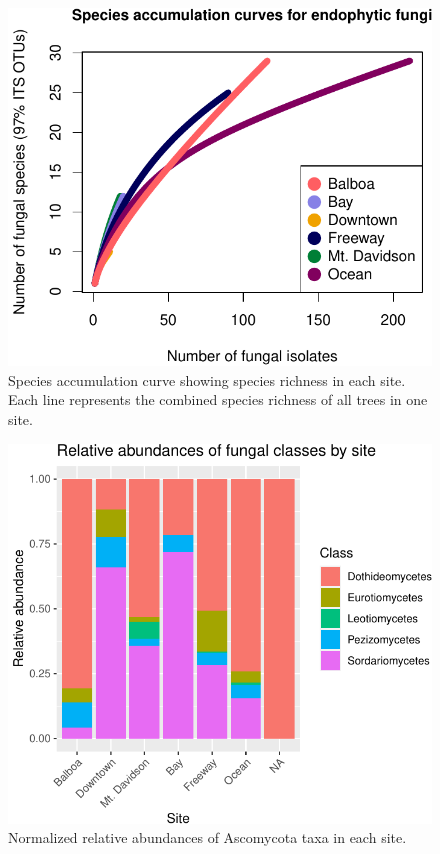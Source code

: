 \documentclass[fleqn,10pt,lineno]{wlpeerj} %
\begin{document}
\begin{figure}
\centering
\includegraphics{gibson2021_files/figure-latex/rarefaction-plot-1.pdf}
\caption{\label{fig:rarefaction-plot}Species accumulation curve showing species richness in each site. Each line represents the combined species richness of all trees in one site.}
\end{figure}

\begin{figure}
\centering
\includegraphics{gibson2021_files/figure-latex/taxonomy-by-site-plot-1.pdf}
\caption{\label{fig:taxonomy-by-site-plot}Normalized relative abundances of Ascomycota taxa in each site.}
\end{figure}
\end{document}
